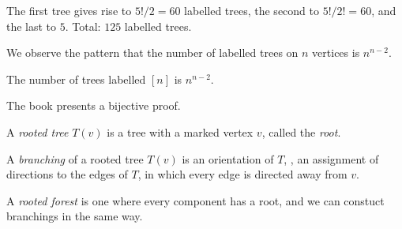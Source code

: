\begin{examples}
\begin{center}
        \quad
        \quad
    \end{center}
    The first tree gives rise to $5!/2 = 60$ labelled trees, the second
    to $5!/2! = 60$, and the last to $5$.
    Total: $125$ labelled trees.
\end{examples}
We observe the pattern that the number of labelled trees on $n$ vertices
is $n^{n-2}$.

\begin{theorem*} \label{thm:tree:cayley}
    The number of trees labelled $[n]$ is $n^{n-2}$.
\end{theorem*}
\begin{remark}
    The book presents a bijective proof.
\end{remark}

\begin{definition*}
    A \emph{rooted tree} $T(v)$ is a tree with a marked vertex $v$, called
    the \emph{root}.

    A \emph{branching} of a rooted tree $T(v)$ is an orientation of $T$,
    \ie, an assignment of directions to the edges of $T$, in
    which every edge is directed away from $v$.

    A \emph{rooted forest} is one where every component has a root,
    and we can constuct branchings in the same way.
\end{definition*}

